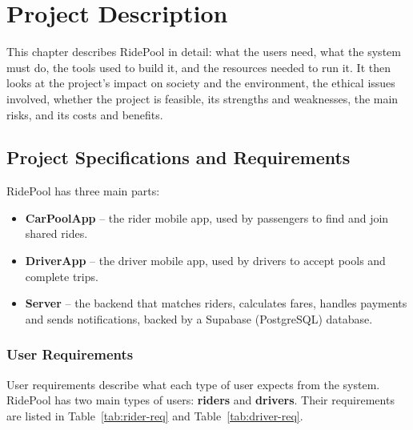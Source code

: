 \chapter{Project Description}
\label{ch:project-description}

This chapter describes RidePool in detail: what the users need, what the
system must do, the tools used to build it, and the resources needed to run
it. It then looks at the project's impact on society and the environment, the
ethical issues involved, whether the project is feasible, its strengths and
weaknesses, the main risks, and its costs and benefits.

\section{Project Specifications and Requirements}
\label{sec:specifications}

RidePool has three main parts:

\begin{itemize}
  \item \textbf{CarPoolApp} -- the rider mobile app, used by passengers to find
        and join shared rides.
  \item \textbf{DriverApp} -- the driver mobile app, used by drivers to accept
        pools and complete trips.
  \item \textbf{Server} -- the backend that matches riders, calculates fares,
        handles payments and sends notifications, backed by a Supabase
        (PostgreSQL) database.
\end{itemize}

\subsection{User Requirements}
\label{subsec:user-requirements}

User requirements describe what each type of user expects from the system.
RidePool has two main types of users: \textbf{riders} and \textbf{drivers}.
Their requirements are listed in Table~\ref{tab:rider-req} and
Table~\ref{tab:driver-req}.

